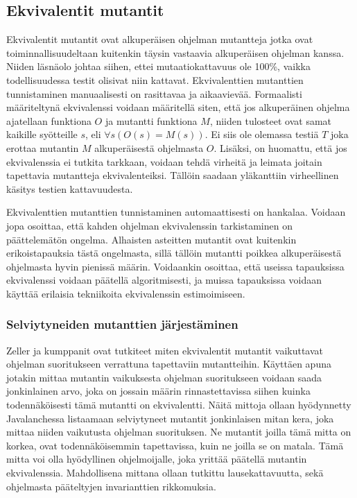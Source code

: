 \documentclass{tktltiki}
\begin{document}
\subsection{Ekvivalentit mutantit}
Ekvivalentit mutantit ovat alkuperäisen ohjelman mutantteja jotka ovat toiminnallisuudeltaan kuitenkin täysin vastaavia alkuperäisen ohjelman kanssa. Niiden läsnäolo johtaa siihen, ettei mutaatiokattavuus ole 100\%, vaikka todellisuudessa testit olisivat niin kattavat. Ekvivalenttien mutanttien tunnistaminen manuaalisesti on rasittavaa ja aikaavievää. Formaalisti määriteltynä ekvivalenssi voidaan määritellä siten, että jos alkuperäinen ohjelma ajatellaan funktiona $O$ ja mutantti funktiona $M$, niiden tulosteet ovat samat kaikille syötteille $s$, eli $\forall s(O(s) = M(s))$. Ei siis ole olemassa testiä $T$ joka erottaa mutantin $M$ alkuperäisestä ohjelmasta $O$. Lisäksi, on huomattu, että jos ekvivalenssia ei tutkita tarkkaan, voidaan tehdä virheitä ja leimata joitain tapettavia mutantteja ekvivalenteiksi. Tällöin saadaan yläkanttiin virheellinen käsitys testien kattavuudesta. %

Ekvivalenttien mutanttien tunnistaminen automaattisesti on hankalaa. Voidaan jopa osoittaa, että kahden ohjelman ekvivalenssin tarkistaminen on päättelemätön ongelma. Alhaisten asteitten mutantit ovat kuitenkin erikoistapauksia tästä ongelmasta, sillä tällöin mutantti poikkea alkuperäisestä ohjelmasta hyvin pienissä määrin. Voidaankin osoittaa, että useissa tapauksissa ekvivalenssi voidaan päätellä algoritmisesti, ja muissa tapauksissa voidaan käyttää erilaisia tekniikoita ekvivalenssin estimoimiseen. 

\subsubsection{Selviytyneiden mutanttien järjestäminen}
Zeller ja kumppanit ovat tutkiteet miten ekvivalentit mutantit vaikuttavat ohjelman suoritukseen verrattuna tapettaviin mutantteihin. Käyttäen apuna jotakin mittaa mutantin vaikuksesta ohjelman suoritukseen voidaan saada jonkinlainen arvo, joka on jossain määrin rinnastettavissa siihen kuinka todennäköisesti tämä mutantti on ekvivalentti. Näitä mittoja ollaan hyödynnetty Javalanchessa listaamaan selviytyneet mutantit jonkinlaisen mitan kera, joka mittaa niiden vaikutusta ohjelman suorituksen. Ne mutantit joilla tämä mitta on korkea, ovat todennäköisemmin tapettavissa, kuin ne joilla se on matala. Tämä mitta voi olla hyödyllinen ohjelmoijalle, joka yrittää päätellä mutantin ekvivalenssia. Mahdollisena mittana ollaan tutkittu lausekattavuutta, sekä ohjelmasta pääteltyjen invarianttien rikkomuksia.
\end{document}
